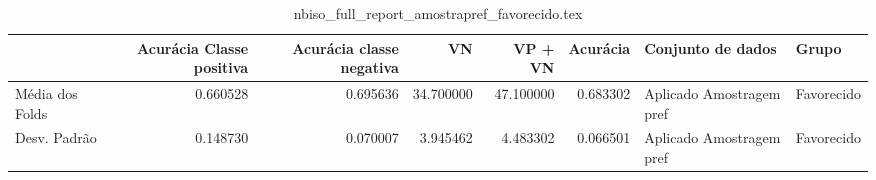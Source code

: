 \begin{table}
\centering
\caption{nbiso_full_report_amostrapref_favorecido.tex}
\label{nbiso_full_report_amostrapref_favorecido.tex}
\begin{tabular}{lrrrrrll}
\toprule
{} &  Acurácia Classe positiva &  Acurácia classe negativa &        VN  &   VP + VN  &  Acurácia &         Conjunto de dados &       Grupo \\
\midrule
Média dos Folds &                  0.660528 &                  0.695636 &  34.700000 &  47.100000 &  0.683302 &  Aplicado Amostragem pref &  Favorecido \\
Desv. Padrão    &                  0.148730 &                  0.070007 &   3.945462 &   4.483302 &  0.066501 &  Aplicado Amostragem pref &  Favorecido \\
\bottomrule
\end{tabular}
\end{table}
